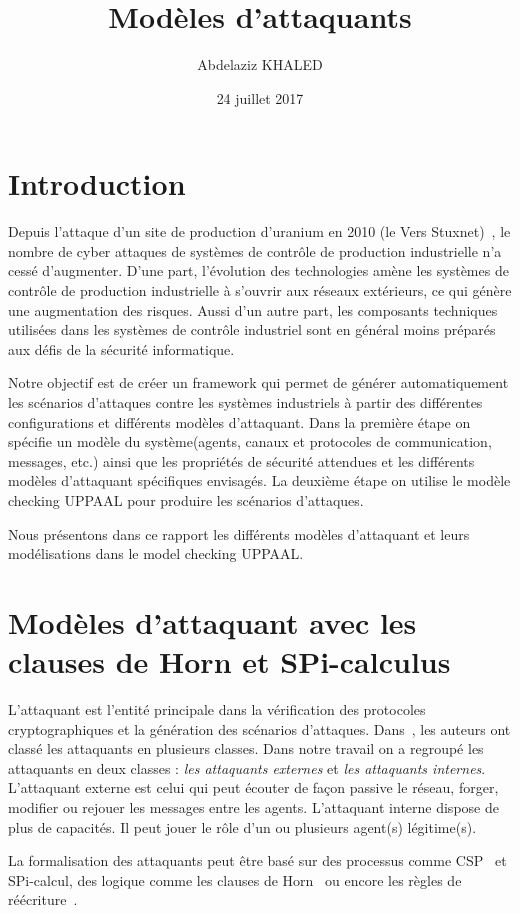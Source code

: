 \documentclass[10pt,a4paper]{article}
\title{Modèles d'attaquants}
\author{Abdelaziz KHALED}
\date{24 juillet 2017}
\begin{document}
\let\cleardoublepage\clearpage
\maketitlepage
\tableofcontents
\newpage
\section{Introduction}
Depuis l’attaque d’un site de production d’uranium en 2010 (le Vers Stuxnet)~\cite{ref11}, le nombre de cyber attaques de systèmes de contrôle de production industrielle n’a cessé d’augmenter. D'une part, l'évolution des technologies amène les systèmes de contrôle de production industrielle à s'ouvrir aux réseaux extérieurs, ce qui génère une augmentation des risques. Aussi d'un autre part, les composants techniques utilisées dans les systèmes de contrôle industriel sont en général moins préparés aux défis de la sécurité informatique.
\newline

Notre objectif est de créer un framework qui permet de générer automatiquement les scénarios d'attaques contre les systèmes industriels à partir des différentes configurations et différents modèles d'attaquant. Dans la première étape on spécifie un modèle du système(agents, canaux et protocoles de communication, messages, etc.) ainsi que les propriétés de sécurité attendues et les différents modèles d'attaquant spécifiques envisagés. La deuxième étape on utilise le modèle checking UPPAAL pour produire les scénarios d'attaques.\newline

Nous présentons dans ce rapport les différents modèles d'attaquant et leurs modélisations dans le model checking UPPAAL.  
\section{Modèles d'attaquant avec les clauses de Horn et SPi-calculus}
L'attaquant est l'entité principale dans la vérification des protocoles cryptographiques et la génération des scénarios d'attaques. Dans~\cite{ref1}, les auteurs ont classé les attaquants en plusieurs classes. Dans notre travail on a regroupé les attaquants en deux classes : \textit{les attaquants externes} et \textit{les attaquants internes}. L'attaquant externe est celui qui peut écouter de façon passive le réseau, forger, modifier ou rejouer les messages entre les agents. L'attaquant interne dispose de plus de capacités. Il peut jouer le rôle d'un ou plusieurs agent(s) légitime(s).\newline

La formalisation des attaquants peut \^{e}tre basé sur des processus comme CSP~\cite{ref6} et SPi-calcul\cite{ref7}, des logique comme les clauses de Horn~\cite{ref2} ou encore les règles de réécriture~\cite{ref10}.\newline  
\end{document}
